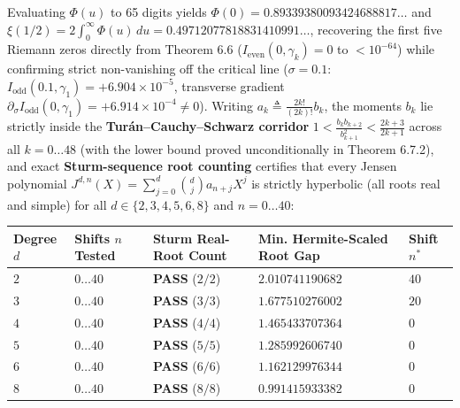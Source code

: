 \documentclass[
  11pt,
]{article}
\newcounter{none} %
\begin{document}
Evaluating \(\Phi(u)\) to 65 digits yields
\(\Phi(0) = 0.89339380093424688817\dots\) and
\(\xi(1/2) = 2\int_0^\infty \Phi(u)\,du = 0.49712077818831410991\dots\),
recovering the first five Riemann zeros directly from Theorem 6.6
(\(I_{\text{even}}(0, \gamma_k) = 0\) to \(< 10^{-64}\)) while
confirming strict non-vanishing off the critical line (\(\sigma = 0.1\):
\(I_{\text{odd}}(0.1, \gamma_1) = +6.904 \times 10^{-5}\), transverse
gradient
\(\partial_\sigma I_{\text{odd}}(0, \gamma_1) = +6.914 \times 10^{-4} \neq 0\)).
Writing \(a_k \triangleq \frac{2 k!}{(2k)!} b_k\), the moments \(b_k\)
lie strictly inside the \textbf{Turán--Cauchy--Schwarz corridor}
\(1 < \frac{b_k b_{k+2}}{b_{k+1}^2} < \frac{2k+3}{2k+1}\) across all
\(k = 0 \dots 48\) (with the lower bound proved unconditionally in
Theorem 6.7.2), and exact \textbf{Sturm-sequence root counting}
certifies that every Jensen polynomial
\(J^{d,n}(X) = \sum_{j=0}^d \binom{d}{j} a_{n+j} X^j\) is strictly
hyperbolic (all roots real and simple) for all
\(d \in \{2, 3, 4, 5, 6, 8\}\) and \(n = 0 \dots 40\):

{\def\LTcaptype{none} %
\begin{longtable}[]{@{}
  >{\centering\arraybackslash}p{}
  >{\centering\arraybackslash}p{}
  >{\centering\arraybackslash}p{}
  >{\centering\arraybackslash}p{}
  >{\centering\arraybackslash}p{}@{}}
\toprule\noalign{}
\begin{minipage}[b]{\linewidth}\centering
Degree \(d\)
\end{minipage} & \begin{minipage}[b]{\linewidth}\centering
Shifts \(n\) Tested
\end{minipage} & \begin{minipage}[b]{\linewidth}\centering
Sturm Real-Root Count
\end{minipage} & \begin{minipage}[b]{\linewidth}\centering
Min. Hermite-Scaled Root Gap
\end{minipage} & \begin{minipage}[b]{\linewidth}\centering
Shift \(n^*\)
\end{minipage} \\
\midrule\noalign{}
\endhead
\bottomrule\noalign{}
\endlastfoot
\(2\) & \(0 \dots 40\) & \textbf{PASS} (\(2/2\)) & \(2.010741190682\) &
\(40\) \\
\(3\) & \(0 \dots 40\) & \textbf{PASS} (\(3/3\)) & \(1.677510276002\) &
\(20\) \\
\(4\) & \(0 \dots 40\) & \textbf{PASS} (\(4/4\)) & \(1.465433707364\) &
\(0\) \\
\(5\) & \(0 \dots 40\) & \textbf{PASS} (\(5/5\)) & \(1.285992606740\) &
\(0\) \\
\(6\) & \(0 \dots 40\) & \textbf{PASS} (\(6/6\)) & \(1.162129976344\) &
\(0\) \\
\(8\) & \(0 \dots 40\) & \textbf{PASS} (\(8/8\)) & \(0.991415933382\) &
\(0\) \\
\end{longtable}
}
\end{document}
